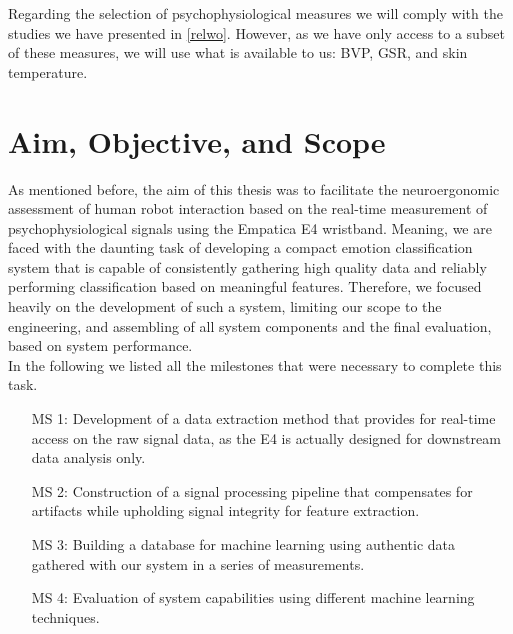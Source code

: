 Regarding the selection of psychophysiological measures we will comply with the studies we have presented in \ref{relwo}. However, as we have only access to a subset of these measures, we will use what is available to us: BVP, GSR, and skin temperature.
\newpage
\section{Aim, Objective, and Scope}
As mentioned before, the aim of this thesis was to facilitate the neuroergonomic assessment of human robot interaction based on the real-time measurement of psychophysiological signals using the Empatica E4 wristband. 
Meaning, we are faced with the daunting task of developing a compact emotion classification system that is capable of consistently gathering high quality data and reliably performing classification based on meaningful features.
Therefore, we focused heavily on the development of such a system, limiting our scope to the engineering, and assembling of all system components and the final evaluation, based on system performance.\\
In the following we listed all the milestones that were necessary to complete this task.

\begin{center}
\begin{enumerate}
\item[MS 1:] Development of a data extraction method that provides for real-time access on the raw signal data, as the E4 is actually designed for downstream data analysis only.
\item[MS 2:] Construction of a signal processing pipeline that compensates for artifacts while upholding signal integrity for feature extraction.
\item[MS 3:] Building a database for machine learning using authentic data gathered with our system in a series of measurements. 
\item[MS 4:] Evaluation of system capabilities using different machine learning techniques.
\end{enumerate}
\end{center}

